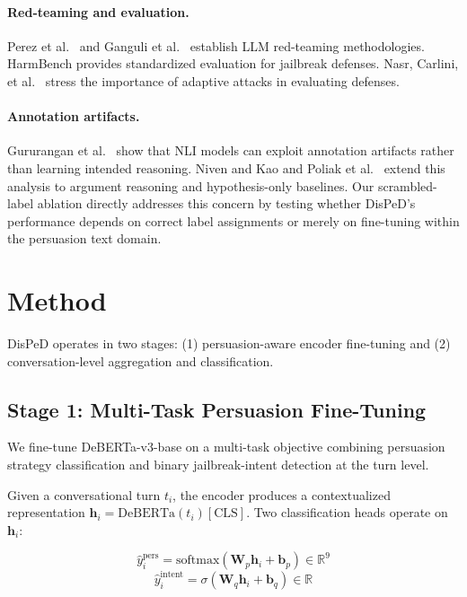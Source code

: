 \documentclass[11pt,a4paper]{article}
\newcommand{\ours}{DisPeD}
\begin{document}
\paragraph{Red-teaming and evaluation.}
Perez et al.~\cite{perez2022red} and Ganguli et al.~\cite{ganguli2022red} establish LLM red-teaming methodologies. HarmBench \cite{mazeika2024harmbench} provides standardized evaluation for jailbreak defenses. Nasr, Carlini, et al.~\cite{nasr2025adaptive} stress the importance of adaptive attacks in evaluating defenses.

\paragraph{Annotation artifacts.}
Gururangan et al.~\cite{gururangan2018annotation} show that NLI models can exploit annotation artifacts rather than learning intended reasoning. Niven and Kao \cite{niven2019probing} and Poliak et al.~\cite{poliak2018hypothesis} extend this analysis to argument reasoning and hypothesis-only baselines. Our scrambled-label ablation directly addresses this concern by testing whether \ours{}'s performance depends on correct label assignments or merely on fine-tuning within the persuasion text domain.


\section{Method}

\ours{} operates in two stages: (1) persuasion-aware encoder fine-tuning and (2) conversation-level aggregation and classification.

\subsection{Stage 1: Multi-Task Persuasion Fine-Tuning}

We fine-tune DeBERTa-v3-base \cite{he2021debertav3} on a multi-task objective combining persuasion strategy classification and binary jailbreak-intent detection at the turn level.

Given a conversational turn $t_i$, the encoder produces a contextualized representation $\mathbf{h}_i = \text{DeBERTa}(t_i)[\text{CLS}]$. Two classification heads operate on $\mathbf{h}_i$:

\begin{equation}
\hat{y}^{\text{pers}}_i = \text{softmax}(\mathbf{W}_p \mathbf{h}_i + \mathbf{b}_p) \in \mathbb{R}^{9}
\end{equation}
\begin{equation}
\hat{y}^{\text{intent}}_i = \sigma(\mathbf{W}_q \mathbf{h}_i + \mathbf{b}_q) \in \mathbb{R}
\end{equation}
\end{document}
